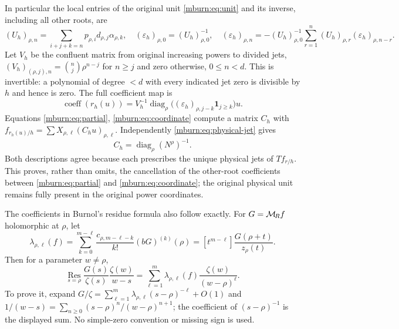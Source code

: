 In particular the local entries of the original unit
\eqref{mburn:eq:unit} and its inverse, including all other roots, are
\begin{equation}\label{mburn:eq:fullunit}
 (U_h)_{\rho,n}=\sum_{i+j+k=n}p_{\rho,i}d_{\rho,j}\alpha_{\rho,k},
 \quad(\varepsilon_h)_{\rho,0}=(U_h)_{\rho,0}^{-1},\quad
 (\varepsilon_h)_{\rho,n}=-(U_h)_{\rho,0}^{-1}
       \sum_{r=1}^n(U_h)_{\rho,r}(\varepsilon_h)_{\rho,n-r}.
\end{equation}
Let $V_h$ be the confluent matrix from original increasing powers
to divided jets, $(V_h)_{(\rho,j),n}=\binom nj\rho^{n-j}$ for
$n\geq j$ and zero otherwise, $0\leq n<d$. This is invertible:
a polynomial of degree $<d$ with every indicated jet zero is
divisible by $h$ and hence is zero. The full coefficient map is
\begin{equation}\label{mburn:eq:coordinate}
 \operatorname{coeff}(r_h(u))=
 V_h^{-1}\operatorname{diag}_{\rho}
       \bigl((\varepsilon_h)_{\rho,j-k}\mathbf1_{j\geq k}\bigr)u.
\end{equation}
Equations \eqref{mburn:eq:partial}, \eqref{mburn:eq:coordinate} compute a
matrix $C_h$ with $f_{r_h(u)/h}=\sum X_{\rho,\ell}(C_hu)_{\rho,\ell}$.
Independently \eqref{mburn:eq:physical-jet} gives
\begin{equation}\label{mburn:eq:Ch}
 C_h=\operatorname{diag}_{\rho}(N^\rho)^{-1}.
\end{equation}
Both descriptions agree because each prescribes the unique
physical jets of $T f_{r/h}$. This proves, rather than omits,
the cancellation of the other-root coefficients between
\eqref{mburn:eq:partial} and \eqref{mburn:eq:coordinate}; the original
physical unit remains fully present in the original power coordinates.

The coefficients in Burnol's residue formula also follow exactly.
For $G=\mathcal M_{\!R} f$ holomorphic at $\rho$, let
\begin{equation}\label{mburn:eq:residue-coeff}
 \lambda_{\rho,\ell}(f)=
 \sum_{k=0}^{m-\ell}\frac{c_{\rho,m-\ell-k}}{k!}
                 (bG)^{(k)}(\rho)
 = [t^{m-\ell}]\frac{G(\rho+t)}{z_\rho(t)}.
\end{equation}
Then for a parameter $w\ne\rho$,
\begin{equation}\label{mburn:eq:residue}
 \operatorname*{Res}_{s=\rho}
   \frac{G(s)}{\zeta(s)}\frac{\zeta(w)}{w-s}
   =\sum_{\ell=1}^m\lambda_{\rho,\ell}(f)
                                    \frac{\zeta(w)}{(w-\rho)^\ell}.
\end{equation}
To prove it, expand $G/\zeta=\sum_{\ell=1}^m
\lambda_{\rho,\ell}(s-\rho)^{-\ell}+O(1)$ and
$1/(w-s)=\sum_{n\geq0}(s-\rho)^n/(w-\rho)^{n+1}$;
the coefficient of $(s-\rho)^{-1}$ is the displayed sum.
No simple-zero convention or missing sign is used.

